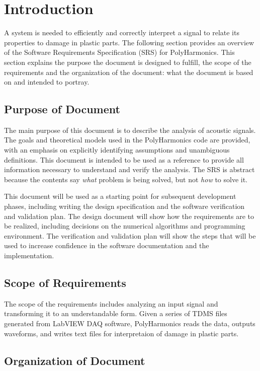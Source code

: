 \documentclass[12pt]{article}
\newcommand{\progname}{PolyHarmonics}
\begin{document}
\section{Introduction}

A system is needed to efficiently and correctly interpret a signal to relate its 
properties to damage in plastic parts.
The following section provides an overview of the Software Requirements
Specification (SRS) for \progname.
This section explains the purpose the document is designed to fulfill, the scope 
of the requirements and the organization of the document: what the document is 
based on and intended to portray.

\subsection{Purpose of Document}

The main purpose of this document is to describe the analysis of acoustic 
signals.
The goals and theoretical models used in the 
\progname{} code are provided, with an emphasis on explicitly identifying 
assumptions and unambiguous definitions.  This document is intended to be used 
as a reference to provide all information necessary to 
understand and verify the analysis.  The SRS is abstract because the contents 
say
\emph{what} problem is being solved, but not \emph{how} to solve it.

This document will be used as a starting point for subsequent development
phases, including writing the design specification and the software verification
and validation plan.  The design document will show how the requirements are to
be realized, including decisions on the numerical algorithms and programming
environment.  The verification and validation plan will show the steps that will
be used to increase confidence in the software documentation and the
implementation.  

\subsection{Scope of Requirements} 

The scope of the requirements includes analyzing an input signal and
transforming it to an understandable form. Given a series of TDMS files 
generated 
from LabVIEW DAQ software, \progname{} reads the data, outputs waveforms, 
and writes text files for interpretaion of damage in plastic parts.

\subsection{Organization of Document}
\end{document}

